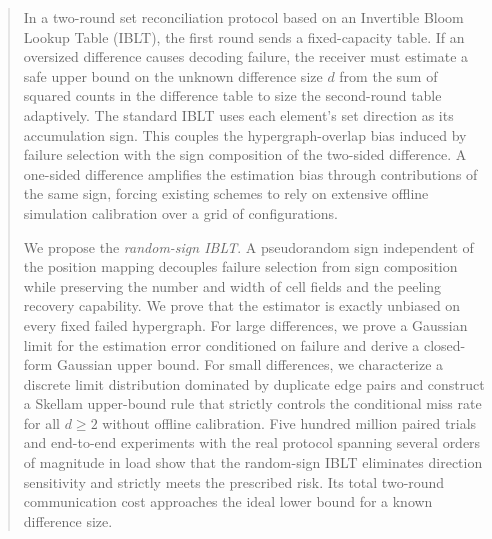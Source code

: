 \begin{abstract}
In a two-round set reconciliation protocol based on an Invertible Bloom Lookup Table (IBLT), the first round sends a fixed-capacity table. If an oversized difference causes decoding failure, the receiver must estimate a safe upper bound on the unknown difference size $d$ from the sum of squared counts in the difference table to size the second-round table adaptively. The standard IBLT uses each element's set direction as its accumulation sign. This couples the hypergraph-overlap bias induced by failure selection with the sign composition of the two-sided difference. A one-sided difference amplifies the estimation bias through contributions of the same sign, forcing existing schemes to rely on extensive offline simulation calibration over a grid of configurations.

We propose the \emph{random-sign IBLT}. A pseudorandom sign independent of the position mapping decouples failure selection from sign composition while preserving the number and width of cell fields and the peeling recovery capability. We prove that the estimator is exactly unbiased on every fixed failed hypergraph. For large differences, we prove a Gaussian limit for the estimation error conditioned on failure and derive a closed-form Gaussian upper bound. For small differences, we characterize a discrete limit distribution dominated by duplicate edge pairs and construct a Skellam upper-bound rule that strictly controls the conditional miss rate for all $d\ge2$ without offline calibration. Five hundred million paired trials and end-to-end experiments with the real protocol spanning several orders of magnitude in load show that the random-sign IBLT eliminates direction sensitivity and strictly meets the prescribed risk. Its total two-round communication cost approaches the ideal lower bound for a known difference size.
\end{abstract}
